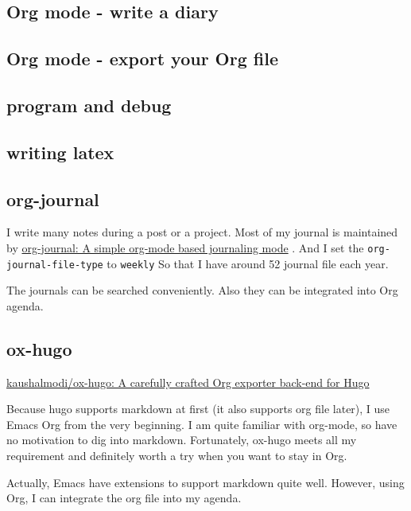 \documentclass[koma,utopia,letterpaper,captions=tableheading,11pt,listings-sv,microtype,paralist,colorlinks=true,urlcolor=blue]{org-article}
\begin{document}
\subsection{Org mode - write a diary}
\label{sec:orgd48d496}

\subsection{Org mode - export your Org file}
\label{sec:org94ce70b}


\subsection{program and debug}
\label{sec:org8c82502}


\subsection{writing latex}
\label{sec:org3f6fba5}
\subsection{org-journal}
\label{sec:org9e0dc38}


I write many notes during a post or a project. Most of my journal is maintained
by \href{https://github.com/bastibe/org-journal}{org-journal: A simple org-mode based journaling mode} . And I set the
\texttt{org-journal-file-type} to \texttt{weekly} So that I have around 52 journal file each
year.

The journals can be searched conveniently. Also they can be integrated into Org
agenda.


\subsection{ox-hugo}
\label{sec:orgeefa353}


\href{https://github.com/kaushalmodi/ox-hugo}{kaushalmodi/ox-hugo: A carefully crafted Org exporter back-end for Hugo}

Because hugo supports markdown at first (it also supports org file later), I use
Emacs Org from the very beginning. I am quite familiar with org-mode, so have no
motivation to dig into markdown. Fortunately, ox-hugo meets all my requirement
and definitely worth a try when you want to stay in Org.

Actually, Emacs have extensions to support markdown quite well. However, using
Org, I can integrate the org file into my agenda.
\end{document}
